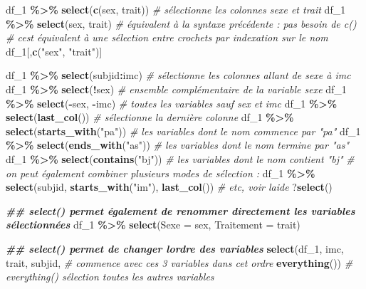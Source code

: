 \documentclass[
]{book}
\newenvironment{Shaded}{\begin{snugshade}}{\end{snugshade}}
\newcommand{\AttributeTok}[1]{\textcolor[rgb]{0.13,0.29,0.53}{#1}}
\newcommand{\CommentTok}[1]{\textcolor[rgb]{0.56,0.35,0.01}{\textit{#1}}}
\newcommand{\DocumentationTok}[1]{\textcolor[rgb]{0.56,0.35,0.01}{\textbf{\textit{#1}}}}
\newcommand{\FunctionTok}[1]{\textcolor[rgb]{0.13,0.29,0.53}{\textbf{#1}}}
\newcommand{\NormalTok}[1]{#1}
\newcommand{\SpecialCharTok}[1]{\textcolor[rgb]{0.81,0.36,0.00}{\textbf{#1}}}
\newcommand{\StringTok}[1]{\textcolor[rgb]{0.31,0.60,0.02}{#1}}
\begin{document}
\begin{Shaded}
\begin{Highlighting}[]
\NormalTok{df\_1 }\SpecialCharTok{\%\textgreater{}\%} \FunctionTok{select}\NormalTok{(}\FunctionTok{c}\NormalTok{(sex, trait)) }\CommentTok{\# sélectionne les colonnes sexe et trait}
\NormalTok{df\_1 }\SpecialCharTok{\%\textgreater{}\%} \FunctionTok{select}\NormalTok{(sex, trait) }\CommentTok{\# équivalent à la syntaxe précédente : pas besoin de c()}
\CommentTok{\# c\textquotesingle{}est équivalent à une sélection entre crochets par indexation sur le nom }
\NormalTok{df\_1[,}\FunctionTok{c}\NormalTok{(}\StringTok{"sex"}\NormalTok{, }\StringTok{"trait"}\NormalTok{)]}

\NormalTok{df\_1 }\SpecialCharTok{\%\textgreater{}\%} \FunctionTok{select}\NormalTok{(subjid}\SpecialCharTok{:}\NormalTok{imc) }\CommentTok{\# sélectionne les colonnes allant de sexe à imc}
\NormalTok{df\_1 }\SpecialCharTok{\%\textgreater{}\%} \FunctionTok{select}\NormalTok{(}\SpecialCharTok{!}\NormalTok{sex) }\CommentTok{\# ensemble complémentaire de la variable sexe}
\NormalTok{df\_1 }\SpecialCharTok{\%\textgreater{}\%} \FunctionTok{select}\NormalTok{(}\SpecialCharTok{{-}}\NormalTok{sex, }\SpecialCharTok{{-}}\NormalTok{imc) }\CommentTok{\# toutes les variables sauf sex et imc}
\NormalTok{df\_1 }\SpecialCharTok{\%\textgreater{}\%} \FunctionTok{select}\NormalTok{(}\FunctionTok{last\_col}\NormalTok{()) }\CommentTok{\# sélectionne la dernière colonne}
\NormalTok{df\_1 }\SpecialCharTok{\%\textgreater{}\%} \FunctionTok{select}\NormalTok{(}\FunctionTok{starts\_with}\NormalTok{(}\StringTok{"pa"}\NormalTok{)) }\CommentTok{\# les variables dont le nom commence par "pa"}
\NormalTok{df\_1 }\SpecialCharTok{\%\textgreater{}\%} \FunctionTok{select}\NormalTok{(}\FunctionTok{ends\_with}\NormalTok{(}\StringTok{"as"}\NormalTok{)) }\CommentTok{\# les variables dont le nom termine par "as"}
\NormalTok{df\_1 }\SpecialCharTok{\%\textgreater{}\%} \FunctionTok{select}\NormalTok{(}\FunctionTok{contains}\NormalTok{(}\StringTok{"bj"}\NormalTok{)) }\CommentTok{\# les variables dont le nom contient "bj"}
\CommentTok{\# on peut également combiner plusieurs modes de sélection : }
\NormalTok{df\_1 }\SpecialCharTok{\%\textgreater{}\%} \FunctionTok{select}\NormalTok{(subjid, }\FunctionTok{starts\_with}\NormalTok{(}\StringTok{"im"}\NormalTok{), }\FunctionTok{last\_col}\NormalTok{())}
\CommentTok{\# etc, voir l\textquotesingle{}aide}
\NormalTok{?}\FunctionTok{select}\NormalTok{()}

\DocumentationTok{\#\# select() permet également de renommer directement les variables sélectionnées}
\NormalTok{df\_1 }\SpecialCharTok{\%\textgreater{}\%} \FunctionTok{select}\NormalTok{(}\AttributeTok{Sexe =}\NormalTok{ sex, }\AttributeTok{Traitement =}\NormalTok{ trait)}

\DocumentationTok{\#\# select() permet de changer l\textquotesingle{}ordre des variables}
\FunctionTok{select}\NormalTok{(df\_1, }
\NormalTok{       imc, trait, subjid, }\CommentTok{\# commence avec ces 3 variables dans cet ordre}
       \FunctionTok{everything}\NormalTok{()) }\CommentTok{\# everything() sélection toutes les autres variables}
\end{Highlighting}
\end{Shaded}
\end{document}
